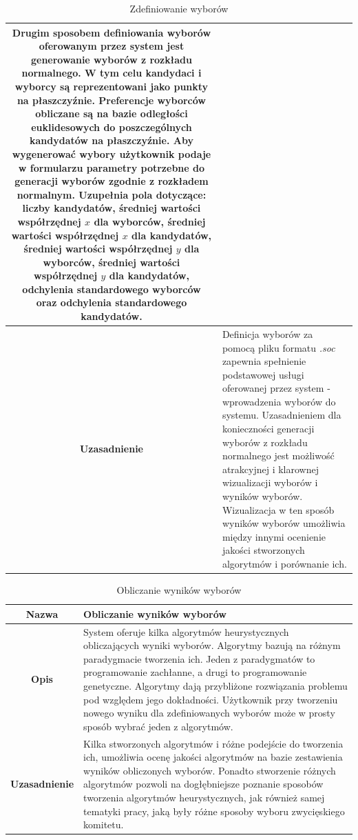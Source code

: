 \documentclass[polish,11pt]{aghthesis}
\begin{document}
\begin{table}
\begin{tabular}{|c|p{12.5cm}|}
Drugim sposobem definiowania wyborów oferowanym przez system
jest generowanie wyborów z rozkładu normalnego. W tym celu
kandydaci i wyborcy są reprezentowani jako punkty na płaszczyźnie.
Preferencje wyborców obliczane są na bazie odległości euklidesowych
do poszczególnych kandydatów na płaszczyźnie. Aby wygenerować
wybory użytkownik podaje w formularzu parametry potrzebne do
generacji wyborów zgodnie z rozkładem normalnym. Uzupełnia pola
dotyczące: liczby kandydatów, średniej wartości współrzędnej $x$ dla
wyborców, średniej wartości współrzędnej $x$ dla kandydatów, średniej
wartości współrzędnej $y$ dla wyborców, średniej wartości współrzędnej
$y$ dla kandydatów, odchylenia standardowego wyborców oraz
odchylenia standardowego kandydatów. \\ 
\hline 
\textbf{Uzasadnienie} & Definicja wyborów za pomocą pliku formatu \textit{.soc} zapewnia spełnienie
podstawowej usługi oferowanej przez system - wprowadzenia wyborów
do systemu. Uzasadnieniem dla konieczności generacji wyborów z
rozkładu normalnego jest możliwość atrakcyjnej i klarownej wizualizacji
wyborów i wyników wyborów. Wizualizacja w ten sposób wyników
wyborów umożliwia między innymi ocenienie jakości stworzonych
algorytmów i porównanie ich.\\ 
\hline 
\end{tabular}
\caption{Zdefiniowanie wyborów} 
\end{table}

\begin{table}
\centering
\begin{tabular}{|c|p{10cm}|}
\hline
\textbf{Nazwa} & Obliczanie wyników wyborów \\ 
\hline 
\textbf{Opis} & System oferuje kilka algorytmów heurystycznych obliczających wyniki
wyborów. Algorytmy bazują na różnym paradygmacie tworzenia ich.
Jeden z paradygmatów to programowanie zachłanne, a drugi to
programowanie genetyczne. Algorytmy dają przybliżone rozwiązania
problemu pod względem jego dokładności. Użytkownik przy tworzeniu
nowego wyniku dla zdefiniowanych wyborów może w prosty sposób
wybrać jeden z algorytmów. \\ 
\hline 
\textbf{Uzasadnienie} & Kilka stworzonych algorytmów i różne podejście do tworzenia ich,
umożliwia ocenę jakości algorytmów na bazie zestawienia wyników
obliczonych wyborów. Ponadto stworzenie różnych algorytmów pozwoli
na dogłębniejsze poznanie sposobów tworzenia algorytmów
heurystycznych, jak również samej tematyki pracy, jaką były różne
sposoby wyboru zwycięskiego komitetu.\\ 
\hline 
\end{tabular}
\caption{Obliczanie wyników wyborów} 
\end{table}
\clearpage
\end{document}
